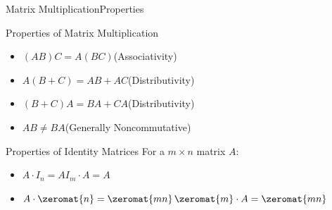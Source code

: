 \documentclass{beamer}
\begin{document}
\begin{frame}{Matrix Multiplication}{Properties}
\begin{block}{Properties of Matrix Multiplication}
\begin{itemize}
\item $(AB)C=A(BC)$\hfill (Associativity)
\item $A(B+C)=AB+AC$\hfill (Distributivity)
\item $(B+C)A=BA+CA$\hfill (Distributivity)\pause
\item $AB\neq BA$\hfill (Generally Noncommutative)
\end{itemize}
\end{block}\pause
\begin{block}{Properties of Identity Matrices}
For a $m\times n$ matrix $A$:
\begin{itemize}
\item $A\cdot I_n = A$\quad{}\quad$I_m\cdot A = A$
\item $A\cdot\zeromat{n} = \zeromat{mn}$\quad{}\quad$\zeromat{m}\cdot A=\zeromat{mn}$
\end{itemize}
\end{block}
\end{frame}
\end{document}
